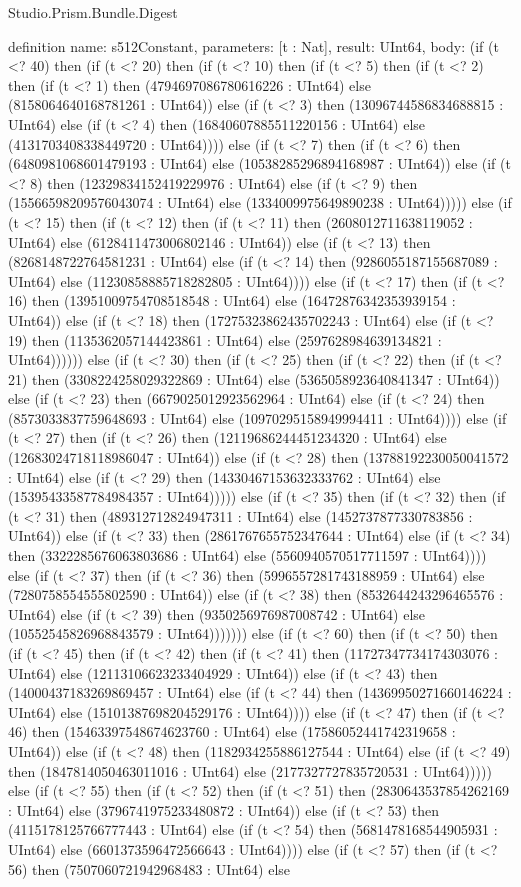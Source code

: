 \begin{lexlean}{Studio.Prism.Bundle.Digest}
\begin{semanticmodule}
definition{
  name: s512Constant,
  parameters: [t : Nat],
  result: UInt64,
  body: (if (t <? 40) then (if (t <? 20) then (if (t <? 10) then (if (t <? 5) then (if (t <? 2) then (if (t <? 1) then (4794697086780616226 : UInt64) else (8158064640168781261 : UInt64)) else (if (t <? 3) then (13096744586834688815 : UInt64) else (if (t <? 4) then (16840607885511220156 : UInt64) else (4131703408338449720 : UInt64)))) else (if (t <? 7) then (if (t <? 6) then (6480981068601479193 : UInt64) else (10538285296894168987 : UInt64)) else (if (t <? 8) then (12329834152419229976 : UInt64) else (if (t <? 9) then (15566598209576043074 : UInt64) else (1334009975649890238 : UInt64))))) else (if (t <? 15) then (if (t <? 12) then (if (t <? 11) then (2608012711638119052 : UInt64) else (6128411473006802146 : UInt64)) else (if (t <? 13) then (8268148722764581231 : UInt64) else (if (t <? 14) then (9286055187155687089 : UInt64) else (11230858885718282805 : UInt64)))) else (if (t <? 17) then (if (t <? 16) then (13951009754708518548 : UInt64) else (16472876342353939154 : UInt64)) else (if (t <? 18) then (17275323862435702243 : UInt64) else (if (t <? 19) then (1135362057144423861 : UInt64) else (2597628984639134821 : UInt64)))))) else (if (t <? 30) then (if (t <? 25) then (if (t <? 22) then (if (t <? 21) then (3308224258029322869 : UInt64) else (5365058923640841347 : UInt64)) else (if (t <? 23) then (6679025012923562964 : UInt64) else (if (t <? 24) then (8573033837759648693 : UInt64) else (10970295158949994411 : UInt64)))) else (if (t <? 27) then (if (t <? 26) then (12119686244451234320 : UInt64) else (12683024718118986047 : UInt64)) else (if (t <? 28) then (13788192230050041572 : UInt64) else (if (t <? 29) then (14330467153632333762 : UInt64) else (15395433587784984357 : UInt64))))) else (if (t <? 35) then (if (t <? 32) then (if (t <? 31) then (489312712824947311 : UInt64) else (1452737877330783856 : UInt64)) else (if (t <? 33) then (2861767655752347644 : UInt64) else (if (t <? 34) then (3322285676063803686 : UInt64) else (5560940570517711597 : UInt64)))) else (if (t <? 37) then (if (t <? 36) then (5996557281743188959 : UInt64) else (7280758554555802590 : UInt64)) else (if (t <? 38) then (8532644243296465576 : UInt64) else (if (t <? 39) then (9350256976987008742 : UInt64) else (10552545826968843579 : UInt64))))))) else (if (t <? 60) then (if (t <? 50) then (if (t <? 45) then (if (t <? 42) then (if (t <? 41) then (11727347734174303076 : UInt64) else (12113106623233404929 : UInt64)) else (if (t <? 43) then (14000437183269869457 : UInt64) else (if (t <? 44) then (14369950271660146224 : UInt64) else (15101387698204529176 : UInt64)))) else (if (t <? 47) then (if (t <? 46) then (15463397548674623760 : UInt64) else (17586052441742319658 : UInt64)) else (if (t <? 48) then (1182934255886127544 : UInt64) else (if (t <? 49) then (1847814050463011016 : UInt64) else (2177327727835720531 : UInt64))))) else (if (t <? 55) then (if (t <? 52) then (if (t <? 51) then (2830643537854262169 : UInt64) else (3796741975233480872 : UInt64)) else (if (t <? 53) then (4115178125766777443 : UInt64) else (if (t <? 54) then (5681478168544905931 : UInt64) else (6601373596472566643 : UInt64)))) else (if (t <? 57) then (if (t <? 56) then (7507060721942968483 : UInt64) else }
\end{semanticmodule}
\end{lexlean}
